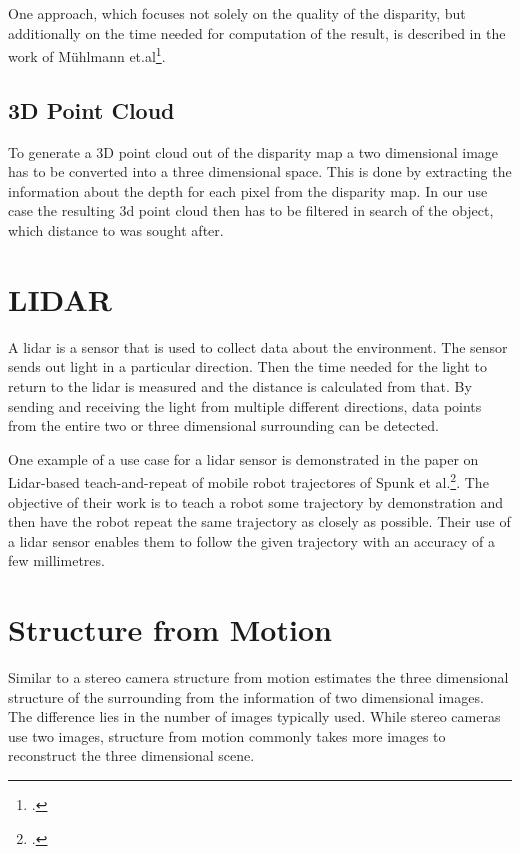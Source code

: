 One approach, which focuses not solely on the quality of the disparity, but additionally on the time needed for computation of the result, is described in the work of Mühlmann et.al\footcite{Muehlmann_Calculating_Dense_Disparity_Maps_from_Color_Stereo_Images}.

\subsection{3D Point Cloud}
To generate a 3D point cloud out of the disparity map a two dimensional image has to be converted into a three dimensional space. This is done by extracting the information about the depth for each pixel from the disparity map. In our use case the resulting 3d point cloud then has to be filtered in search of the object, which distance to was sought after.

\section{LIDAR}
A lidar is a sensor that is used to collect data about the environment. The sensor sends out light in a particular direction. Then the time needed for the light to return to the lidar is measured and the distance is calculated from that. By sending and receiving the light from multiple different directions, data points from the entire two or three dimensional surrounding can be detected.

One example of a use case for a lidar sensor is demonstrated in the paper on Lidar-based teach-and-repeat of mobile robot trajectores of Spunk et al.\footcite{Sprunk_Lidar-based_teach-and-repeat_of_mobile_robot_trajectories}. The objective of their work is to teach a robot some trajectory by demonstration and then have the robot repeat the same trajectory as closely as possible. Their use of a lidar sensor enables them to follow the given trajectory with an accuracy of a few millimetres.

\section{Structure from Motion}
Similar to a stereo camera structure from motion estimates the three dimensional structure of the surrounding from the information of two dimensional images. The difference lies in the number of images typically used. While stereo cameras use two images, structure from motion commonly takes more images to reconstruct the three dimensional scene.

